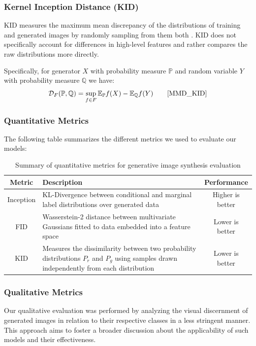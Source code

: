 \documentclass[%
 reprint,
 amsmath,amssymb,
 aps,
]{revtex4-2}
\begin{document}
\subsubsection{Kernel Inception Distance (KID)}
KID measures the maximum mean discrepancy of the distributions of training and generated images by randomly sampling from them both \cite{MMD_KID}. KID does not specifically account for differences in high-level features and rather compares the raw distributions more directly.


Specifically, for generator $X$ with probability measure $\mathbb{P}$ and random variable $Y$ with probability measure $\mathbb{Q}$ we have:
\begin{equation}
\mathcal{D}_F(\mathbb{P},\mathbb{Q}) = \sup_{f\in F}\mathbb{E}_\mathbb{P}f(X) - \mathbb{E}_\mathbb{Q}f(Y)\qquad
\cite{MMD_KID}
\end{equation}

\subsubsection{Quantitative Metrics}
The following table summarizes the different metrics we used to evaluate our models:
\begin{table}[h]
\caption{\label{tab:metrics}
Summary of quantitative metrics for generative image synthesis evaluation \cite{isscore} \cite{fid_gan} \cite{MMD_KID}} 
\begin{ruledtabular}
    \begin{tabular}{cp{4cm}c}
         Metric& Description &Performance\\ \hline 
 Inception & KL-Divergence between conditional and marginal label distributions over generated data & Higher is better\\ \hline
 FID & Wasserstein-2 distance between multivariate Gaussians fitted to data embedded into a feature space & Lower is better\\ \hline
 KID & Measures the dissimilarity between two probability distributions $P_r$ and $P_g$ using samples drawn independently from each distribution & Lower is better\\
    \end{tabular}
\end{ruledtabular}
\end{table}


\subsubsection{Qualitative Metrics}
Our qualitative evaluation was performed by analyzing the visual discernment of generated images in relation to their respective classes in a less stringent manner. This approach aims to foster a broader discussion about the applicability of such models and their effectiveness.
\end{document}
